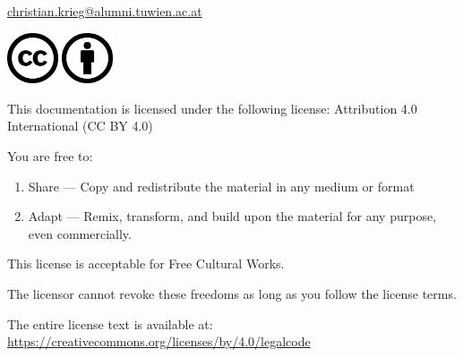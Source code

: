 \documentclass[%
	a4paper,
]
{article}
\begin{document}
\href{christian.krieg@alumni.tuwien.ac.at}{christian.krieg@alumni.tuwien.ac.at}

\vfill

\includegraphics[height=1.5cm]{fig/cc-large.png}
\includegraphics[height=1.5cm]{fig/by-large.png}


This documentation is licensed under the following license:
Attribution 4.0 International (CC BY 4.0)

\vspace{3em}

You are free to:

\begin{enumerate}
    \item Share --- Copy and redistribute the material in any medium or format
    \item Adapt --- Remix, transform, and build upon the material for any purpose,
			even commercially.
\end{enumerate}

This license is acceptable for Free Cultural Works.

The licensor cannot revoke these freedoms as long as you follow the license terms.

The entire license text is available at:
\href{https://creativecommons.org/licenses/by/4.0/legalcode}
	{https://creativecommons.org/licenses/by/4.0/legalcode}


\pagebreak
%
%


\tableofcontents
\printglossaries






\printbibliography
\listoffigures
\end{document}

